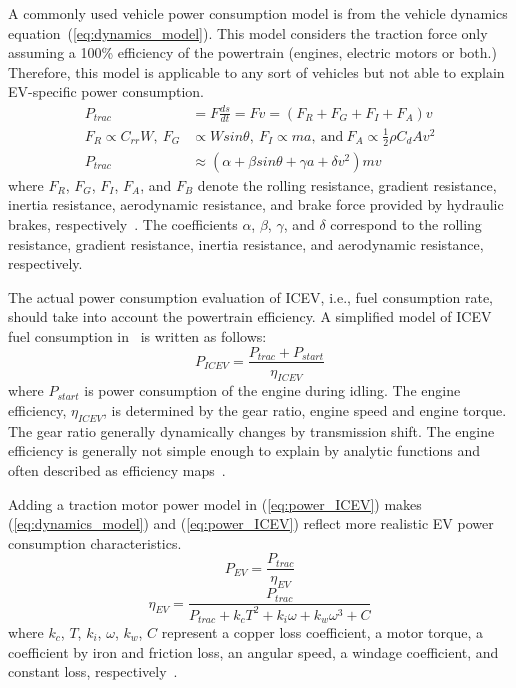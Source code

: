 \documentclass{IEEEtran}
\begin{document}
A commonly used vehicle power consumption model is from the vehicle dynamics equation~(\ref{eq:dynamics_model}). This model considers the traction force only assuming a 100\% efficiency of the powertrain (engines, electric motors or both.) Therefore, this model is applicable to any sort of vehicles but not able to explain EV-specific power consumption.
%
\begin{equation}  \label{eq:dynamics_model} %
\begin{split}
P_{trac}	&= F \frac{ds}{dt} = Fv= (F_{R} + F_{G} + F_{I} + F_{A}) v \\
F_{R} \propto C_{rr}W,~F_{G} &\propto Wsin\theta,~F_{I} \propto ma,~\text{and}~F_{A} \propto \frac{1}{2} \rho C_d Av^2 \\
P_{trac} &\approx (\alpha  + \beta sin\theta + \gamma a + \delta v^2)mv
\end{split}
\end{equation}
where $F_R$, $F_G$, $F_I$, $F_A$, and $F_B$ denote the rolling resistance, gradient resistance, inertia resistance, aerodynamic resistance, and brake force provided by hydraulic brakes, respectively~\cite{Park:DAC13}. The coefficients $\alpha$, $\beta$, $\gamma$, and $\delta$ correspond to the rolling resistance, gradient resistance, inertia resistance, and aerodynamic resistance, respectively.

The actual power consumption evaluation of ICEV, i.e., fuel consumption rate, should take into account the powertrain efficiency. A simplified model of ICEV fuel consumption in~\cite{Kamal:TITS11} is written as follows:
%
\begin{equation} \label{eq:power_ICEV} %
P_{ICEV} = \frac{P_{trac} + P_{start}}{\eta_{ICEV}} 
\end{equation}
where $P_{start}$ is power consumption of the engine during idling. The engine efficiency, $\eta_{ICEV}$, is determined by the gear ratio, engine speed and engine torque. The gear ratio generally dynamically changes by transmission shift. The engine efficiency is generally not simple enough to explain by analytic functions and often described as efficiency maps~\cite{Kamal:TITS11}.

Adding a traction motor power model in (\ref{eq:power_ICEV}) makes (\ref{eq:dynamics_model}) and (\ref{eq:power_ICEV}) reflect more realistic EV power consumption characteristics. 
%
\begin{equation} \label{eq:motorloss_model} %
P_{EV} = \frac{P_{trac}}{\eta_{EV}}
\end{equation}
\begin{equation}
\eta_{EV} = \frac{P_{trac}}{{P_{trac} + k_c T^2 + k_i \omega + k_w \omega^3 + C}}\nonumber 
\end{equation}
where $k_c$, $T$, $k_i$, $\omega$, $k_w$, $C$ represent a copper loss coefficient, a motor torque, a coefficient by iron and friction loss, an angular speed, a windage coefficient, and constant loss, respectively~\cite{Hong:ASPDAC16}.
\end{document}
